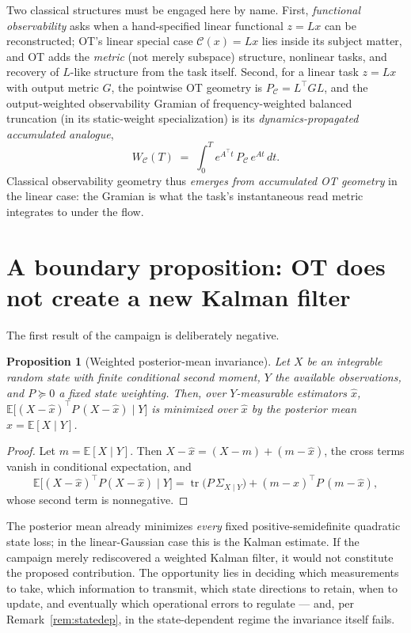 \documentclass[letterpaper,onecolumn]{IEEEtran}
\newtheorem{proposition}{Proposition}
\theoremstyle{definition}
\theoremstyle{remark}
\newcommand{\E}{\mathbb{E}}
\newcommand{\PC}{P_{\mathcal{C}}}
\newcommand{\tr}{\operatorname{tr}}
\newcommand{\C}{\mathcal{C}}
\newcommand{\Sig}{\Sigma}
\begin{document}
Two classical structures must be engaged here by name. First,
\emph{functional observability} \cite{darouach2000,montanari2022} asks when a
hand-specified linear functional $z=Lx$ can be reconstructed; OT's linear
special case $\C(x)=Lx$ lies inside its subject matter, and OT adds the
\emph{metric} (not merely subspace) structure, nonlinear tasks, and
recovery of $L$-like structure from the task itself. Second, for a linear
task $z=Lx$ with output metric $G$, the pointwise OT geometry is
$\PC=L^{\top}GL$, and the output-weighted observability Gramian of
frequency-weighted balanced truncation \cite{enns1984} (in its
static-weight specialization) is its \emph{dynamics-propagated accumulated
analogue},
\begin{equation}
\label{eq:gramian}
W_\C(T)\;=\;\int_0^{T} e^{A^{\top}t}\,\PC\,e^{At}\,dt .
\end{equation}
Classical observability geometry thus \emph{emerges from accumulated OT
geometry} in the linear case: the Gramian is what the task's
instantaneous read metric integrates to under the flow.

\section{A boundary proposition: OT does not create a new Kalman filter}
\label{sec:boundary}

The first result of the campaign is deliberately negative.

\begin{proposition}[Weighted posterior-mean invariance]
\label{prop:invariance}
Let $X$ be an integrable random state with finite conditional second
moment, $Y$ the available observations, and $P\succeq 0$ a fixed state
weighting. Then, over $Y$-measurable estimators $\hat x$,
$\E\big[(X-\hat x)^{\top}P\,(X-\hat x)\mid Y\big]$
is minimized over $\hat x$ by the posterior mean $\hat x=\E[X\mid Y]$.
\end{proposition}

\begin{proof}
Let $m=\E[X\mid Y]$. Then $X-\hat x=(X-m)+(m-\hat x)$, the cross terms vanish
in conditional expectation, and
\begin{equation*}
\E\big[(X-\hat x)^{\top}P(X-\hat x)\mid Y\big]
=\tr\!\big(P\,\Sig_{X\mid Y}\big)+(m-\hat x)^{\top}P\,(m-\hat x),
\end{equation*}
whose second term is nonnegative.
\end{proof}

The posterior mean already minimizes \emph{every} fixed positive-semidefinite
quadratic state loss; in the linear-Gaussian case this is the Kalman
estimate. If the campaign merely rediscovered a weighted Kalman filter, it
would not constitute the proposed contribution. The opportunity lies in
deciding which measurements to take, which information to transmit, which
state directions to retain, when to update, and eventually which operational
errors to regulate --- and, per Remark~\ref{rem:statedep}, in the
state-dependent regime the invariance itself fails.
\end{document}
